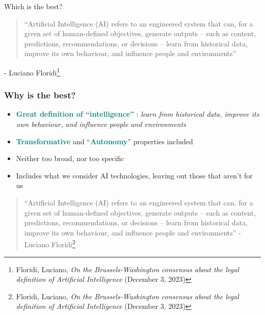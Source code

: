 \documentclass{beamer}
\begin{document}
\begin{frame}{Which is the best?}
\vfill
    \begin{quote}
    “Artificial Intelligence (AI) refers to an engineered system that can, for a given set of human-defined objectives, generate outputs – such as content, predictions, recommendations, or decisions – learn from historical data, improve its own behaviour, and influence people and environments”
    \end{quote}
    \vfill
    \begin{flushright}
    - Luciano Floridi\footnote{Floridi, Luciano, \emph{On the Brussels-Washington consensus about the legal definition of Artificial Intelligence} (December 3, 2023)}
  \end{flushright}
    
\end{frame}



\begin{frame}
\frametitle{Why is the best?}
\vspace{1.5em}
\begin{itemize}
\item \textcolor{teal}{\textbf{Great definition of “intelligence”}} : \textit{learn from historical data, improve its own behaviour, and influence people and environments}
\item \textcolor{teal}{\textbf{Transformative}} and “\textcolor{teal}{\textbf{Autonomy}}” properties included
\item Neither too broad, nor too specific
\item Includes what we consider AI technologies, leaving out those that aren't for us
\end{itemize}

\vspace{3.1em} %
\tiny
\begin{block}{}
\begin{quote}
    “Artificial Intelligence (AI) refers to an engineered system that can, for a given set of human-defined objectives, generate outputs – such as content, predictions, recommendations, or decisions – learn from historical data, improve its own behaviour, and influence people and environments”
    - Luciano Floridi\footnote[frame]{Floridi, Luciano, \emph{On the Brussels-Washington consensus about the legal definition of Artificial Intelligence} (December 3, 2023)}
\end{quote}\end{block}
\end{frame}
\end{document}
